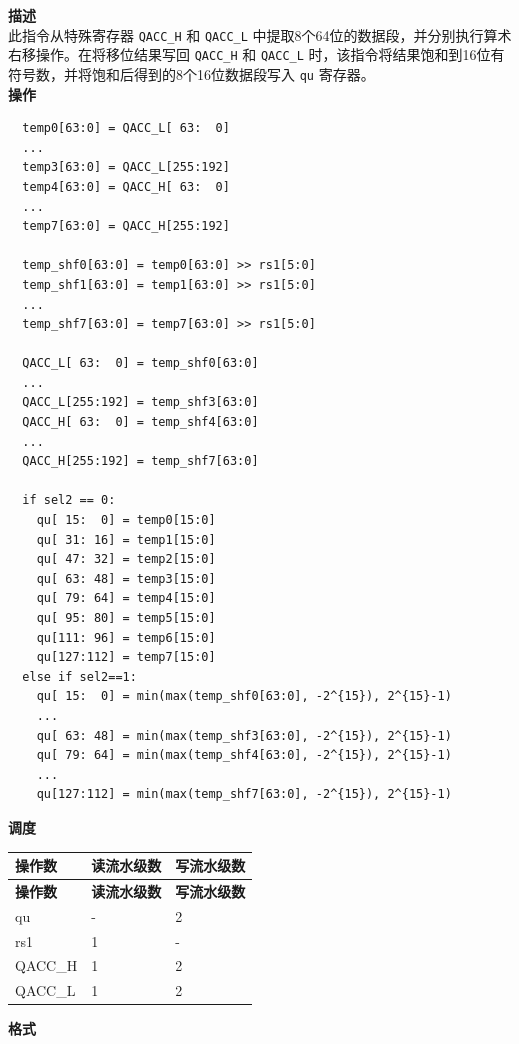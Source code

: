 \textbf{描述}\\
此指令从特殊寄存器 \lstinline{QACC_H} 和 \lstinline{QACC_L} 中提取8个64位的数据段，并分别执行算术右移操作。在将移位结果写回 \lstinline{QACC_H} 和 \lstinline{QACC_L} 时，该指令将结果饱和到16位有符号数，并将饱和后得到的8个16位数据段写入 \lstinline{qu} 寄存器。\\
\textbf{操作}
\begin{lstlisting}
  temp0[63:0] = QACC_L[ 63:  0]
  ...
  temp3[63:0] = QACC_L[255:192]
  temp4[63:0] = QACC_H[ 63:  0]
  ...
  temp7[63:0] = QACC_H[255:192]

  temp_shf0[63:0] = temp0[63:0] >> rs1[5:0]
  temp_shf1[63:0] = temp1[63:0] >> rs1[5:0]
  ...
  temp_shf7[63:0] = temp7[63:0] >> rs1[5:0]

  QACC_L[ 63:  0] = temp_shf0[63:0]
  ...
  QACC_L[255:192] = temp_shf3[63:0]
  QACC_H[ 63:  0] = temp_shf4[63:0]
  ...
  QACC_H[255:192] = temp_shf7[63:0]

  if sel2 == 0:
    qu[ 15:  0] = temp0[15:0]
    qu[ 31: 16] = temp1[15:0]
    qu[ 47: 32] = temp2[15:0]
    qu[ 63: 48] = temp3[15:0]
    qu[ 79: 64] = temp4[15:0]
    qu[ 95: 80] = temp5[15:0]
    qu[111: 96] = temp6[15:0]
    qu[127:112] = temp7[15:0]
  else if sel2==1:
    qu[ 15:  0] = min(max(temp_shf0[63:0], -2^{15}), 2^{15}-1)
    ...
    qu[ 63: 48] = min(max(temp_shf3[63:0], -2^{15}), 2^{15}-1)
    qu[ 79: 64] = min(max(temp_shf4[63:0], -2^{15}), 2^{15}-1)
    ...
    qu[127:112] = min(max(temp_shf7[63:0], -2^{15}), 2^{15}-1)
\end{lstlisting}

\textbf{调度}\\
\begin{longtable}[c]{|l|l|l|}
    \hline
    \rowcolor{lightgray}
    \textbf{操作数} & \textbf{读流水级数} & \textbf{写流水级数} \\\hline
    \endfirsthead
    \hline
    \rowcolor{lightgray}
     \textbf{操作数} & \textbf{读流水级数} & \textbf{写流水级数} \\\hline
    \endhead
    \hline
    \endfoot

  qu & - & 2 \\\hline
  rs1 & 1 & - \\\hline
  QACC\_H & 1 & 2 \\\hline
  QACC\_L & 1 & 2

\end{longtable}

\textbf{格式}\\

